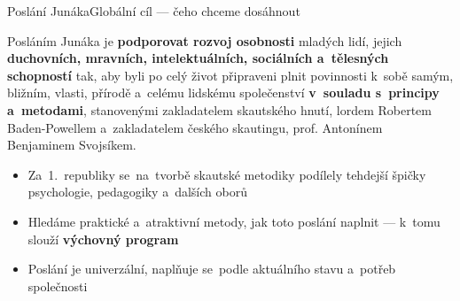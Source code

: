 \documentclass[compress, xelatex, 11pt, xcolor=dvipsnames, aspectratio=169, url={hyphens, lowtilde}]{beamer}
\begin{document}
\begin{frame}{Poslání Junáka}{Globální cíl --- čeho chceme dosáhnout}
	\begin{center}
		\begin{Large}
			Posláním Junáka je \textbf{podporovat rozvoj osobnosti} mladých lidí, jejich \textbf{duchovních, mravních, intelektuálních, sociálních a~tělesných schopností} tak, aby byli po celý život připraveni plnit povinnosti k~sobě samým, bližním, vlasti, přírodě a~celému lidskému společenství \textbf{v~souladu s~principy a~metodami}, stanovenými zakladatelem skautského hnutí, lordem Robertem Baden-Powellem a~zakladatelem českého skautingu, prof. Antonínem Benjaminem Svojsíkem.
		\end{Large}
	\end{center}
	\begin{itemize}
		\item Za~1.~republiky se~na~tvorbě skautské metodiky podílely tehdejší špičky psychologie, pedagogiky a~dalších oborů
		\item Hledáme praktické a~atraktivní metody, jak toto poslání naplnit --- k~tomu slouží \textbf{výchovný program}
		\item Poslání je univerzální, naplňuje se~podle aktuálního stavu a~potřeb společnosti
	\end{itemize}
\end{frame}
\end{document}

